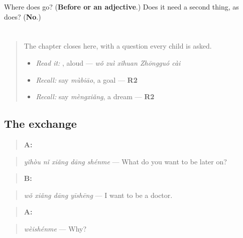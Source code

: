 \begin{tcolorbox}[breakable,colback=teal!4,colframe=teal!35!black,title={Before you move on}]
Where does  go? (\textbf{Before  or an adjective}.) Does it need a second thing, as  does? (\textbf{No}.)
\end{tcolorbox}
\section[Practice]{}

\label{lesson:ZH-C287-practice}



\begin{quote}
The chapter closes here, with a question every child is asked.

\begin{itemize}
\raggedright
  \item \emph{Read it:} , aloud — \emph{wǒ zuì xǐhuan Zhōngguó cài}
  \item \emph{Recall:} say \emph{mùbiāo}, a goal — \textbf{R2}
  \item \emph{Recall:} say \emph{mèngxiǎng}, a dream — \textbf{R2}
\end{itemize}
\end{quote}

\subsection*{The exchange}
\begin{quote}
\textbf{A:} 
\end{quote}

\begin{quote}
\emph{yǐhòu nǐ xiǎng dāng shénme} — What do you want to be later on?
\end{quote}

\begin{quote}
\textbf{B:} 
\end{quote}

\begin{quote}
\emph{wǒ xiǎng dāng yīshēng} — I want to be a doctor.
\end{quote}

\begin{quote}
\textbf{A:} 
\end{quote}

\begin{quote}
\emph{wèishénme} — Why?
\end{quote}

